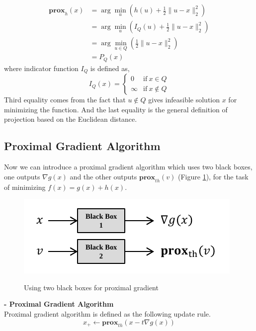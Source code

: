 \documentclass[12pt]{report}
\begin{document}
\begin{align*}
\textbf{prox}_h (x) &= \arg\min_u \left( h(u) + \frac{1}{2}\|u-x\|_2^2 \right)\\
&= \arg\min_u \left( I_Q (u) + \frac{1}{2}\|u-x\|_2^2 \right)\\
&= \arg\min_{u \in Q} \left( \frac{1}{2}\|u-x\|_2^2 \right)\\
&= P_Q (x)
\end{align*}
where indicator function $I_Q$ is defined as, 
\begin{equation*}
I_Q (x) =  \begin{cases}
	0 & \text{if}~x \in Q \\
	\infty & \text{if}~x \notin Q
	\end{cases}  
\end{equation*}
Third equality comes from the fact that $u\notin Q$ gives infeasible solution $x$ for minimizing the function. And the last equality is the general definition of projection based on the Euclidean distance.

\subsection{Proximal Gradient Algorithm}
Now we can introduce a proximal gradient algorithm which uses two black boxes, one outputs $\nabla g(x)$ and the other outputs $\textbf{prox}_{th}(v)$ (Figure \ref{16fig:twoblackboxes}), for the task of minimizing $f(x) = g(x) + h(x)$.
\begin{figure}[ht]
    \centering
    \includegraphics[scale=1]{L16_fig_twoblackboxes}\\
    \caption{Using two black boxes for proximal gradient}\label{16fig:twoblackboxes}
\end{figure}

\vspace{1em}
\noindent\textbf{- Proximal Gradient Algorithm}\\
Proximal gradient algorithm is defined as the following update rule.
\begin{equation}
x_+ \leftarrow \textbf{prox}_{th} \left(x - t\nabla g(x) \right)
\end{equation}
\end{document}

